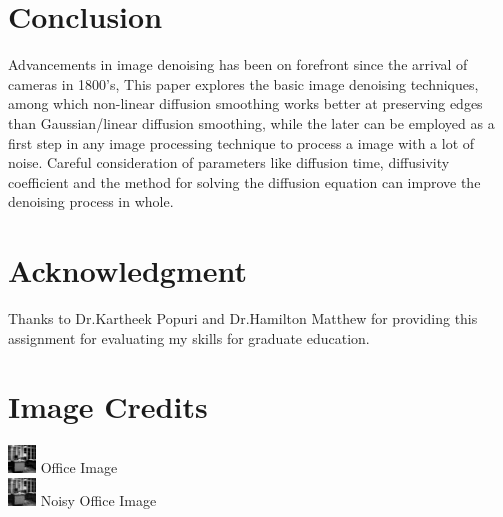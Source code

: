 \documentclass{ipol}
\begin{document}
\section{Conclusion}
Advancements in image denoising has been on forefront since the arrival of cameras in 1800's, This paper explores the basic image denoising techniques, among which non-linear diffusion smoothing works better at preserving edges than Gaussian/linear diffusion smoothing, while the later can be employed as a first step in any image processing technique to process a image with a lot of noise. Careful consideration of parameters like diffusion time, diffusivity coefficient and the method for solving the diffusion equation can improve the denoising process in whole.

\section*{Acknowledgment}

Thanks to Dr.Kartheek Popuri and Dr.Hamilton Matthew for providing this assignment for evaluating my skills for graduate education.

\section*{Image Credits}

{\small
\includegraphics[height=2em]{./images/office}
  Office Image\\
\includegraphics[height=2em]{./images/office_noisy}
  Noisy Office Image
}




\end{document}
